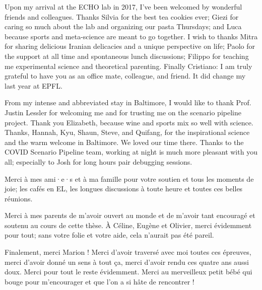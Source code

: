  Upon my arrival at the ECHO lab in 2017, I've been welcomed by wonderful friends and colleagues. Thanks Silvia for the best tea cookies ever; Giezi for caring so much about the lab and organizing our pasta Thursdays; and Luca because sports and meta-science are meant to go together. I wish to thanks Mitra for sharing delicious Iranian delicacies and a unique perspective on life; Paolo for the support at all time and spontaneous lunch discussions; Filippo for teaching me experimental science and theoretical parenting. Finally Cristiano: I am truly grateful to have you as an office mate, colleague, and friend. It did change my last year at EPFL.
 
  From my intense and abbreviated stay in Baltimore, I would like to thank Prof. Justin Lessler for welcoming me and for trusting me on the scenario pipeline project. Thank you Elizabeth, because wine and sports mix so well with science. Thanks, Hannah, Kyu, Shaun, Steve, and Quifang, for the inspirational science and the warm welcome in Baltimore. We loved our time there. Thanks to the COVID Scenario Pipeline team, working at night is much more pleasant with you all; especially to Josh for long hours pair debugging sessions.
 
 Merci à mes ami·e·s et à ma famille pour votre soutien et tous les moments de joie; les cafés en EL, les longues discussions à toute heure et toutes ces belles réunions.

Merci à mes parents de m'avoir ouvert au monde et de m'avoir tant encouragé et soutenu au cours de cette thèse. À Céline, Eugène et Olivier, merci évidemment pour tout; sans votre folie et votre aide, cela n'aurait pas été pareil.

Finalement, merci Marion ! Merci d'avoir traversé avec moi toutes ces épreuves, merci d'avoir donné un sens à tout ça, merci d'avoir rendu ces quatre ans aussi doux. Merci pour tout le reste évidemment. Merci au merveilleux petit bébé qui bouge pour m'encourager et que l'on a si hâte de rencontrer !
 

